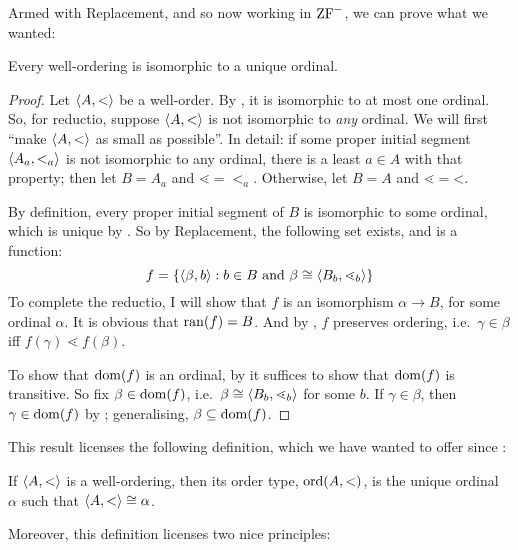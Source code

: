 \documentclass[../../../include/open-logic-section]{subfiles}
\begin{document}

Armed with Replacement, and so now working in $\mathrm{ZF}^{-}$, we can prove
what we wanted:

\begin{thm}
Every well-ordering is isomorphic to a unique ordinal. 
\end{thm}

\begin{proof}
Let $\langle A, < \rangle$ be a well-order. By
, it is isomorphic to at most one
ordinal. So, for reductio, suppose $\langle A, < \rangle$ is not isomorphic to
\emph{any} ordinal. We will first ``make $\langle A, < \rangle$ as small as
possible''. In detail: if some proper initial segment $\langle A_a,
<_a \rangle$ is not isomorphic to any ordinal, there is a least $a \in A$
with that property; then let $B = A_a$ and $\mathord{\lessdot} =
\mathord{<_a}$. Otherwise, let $B = A$ and $\mathord{\lessdot} =
\mathord{<}$. 

By definition, every proper initial segment of $B$ is isomorphic to
some ordinal, which is unique by . So
by Replacement, the following set exists, and is a function:
\[
	f = \{ \langle \beta, b \rangle : b \in B\text{ and }\beta \cong \langle B_b, \lessdot_b \rangle \}
\]
To complete the reductio, I will show that $f$ is an isomorphism
$\alpha \to B$, for some ordinal $\alpha$. It is obvious that $\mathrm{ran}(f)
= B$. And by , $f$ preserves ordering,
i.e.\ $\gamma \in \beta$ iff $f(\gamma) \lessdot f(\beta)$. 

To show that $\mathrm{dom}(f)$ is an ordinal, by
 it suffices to show that
$\mathrm{dom}(f)$ is transitive. So fix $\beta \in \mathrm{dom}(f)$, i.e.\
$\beta \cong \langle B_b, \lessdot_b \rangle$ for some $b$. If $\gamma \in
\beta$, then $\gamma \in \mathrm{dom}(f)$ by
; generalising, $\beta \subseteq
\mathrm{dom}(f)$.
\end{proof}

This result licenses the following definition, which we have wanted to
offer since \olref[vn]{sec}:

\begin{defn}
If $\langle A, < \rangle$ is a well-ordering, then its order type,
$\mathrm{ord}(A, <)$, is the unique ordinal $\alpha$ such that
$\langle A, <  \rangle \cong \alpha$.
\end{defn}

Moreover, this definition licenses two nice principles:
\end{document}
